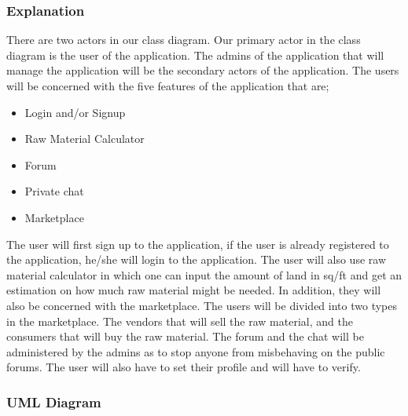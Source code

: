 \documentclass{article}
\begin{document}
\subsubsection*{Explanation}

There are two actors in our class diagram. Our primary actor in the class diagram is the user of the application. The admins of the application that will manage the application will be the secondary actors of the application. The users will be concerned with the five features of the application that are; 

\begin{itemize}
    \item Login and/or Signup
    \item Raw Material Calculator 
    \item Forum 
    \item Private chat
    \item Marketplace
\end{itemize}

The user will first sign up to the application, if the user is already registered to the application, he/she will login to the application. The user will also use raw material calculator in which one can input the amount of land in sq/ft and get an estimation on how much raw material might be needed. In addition, they will also be concerned with the marketplace. The users will be divided into two types in the marketplace. The vendors that will sell the raw material, and the consumers that will buy the raw material. The forum and the chat will be administered by the admins as to stop anyone from misbehaving on the public forums. The user will also have to set their profile and will have to verify. 

\newpage

\subsubsection*{UML Diagram}
\end{document}
